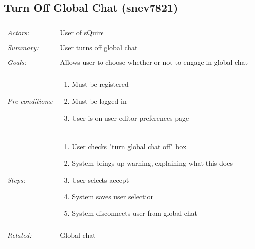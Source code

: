\documentclass[11pt]{report}
\begin{document}
\subsection{Turn Off Global Chat (snev7821)}
\begin{tabular}{ p{2cm} p{12cm} }
\hline
\\
	\textit{Actors:} & User of sQuire \\
	\\
	\textit{Summary:} & User turns off global chat \\
	\\
	\textit{Goals:} & Allows user to choose whether or not to engage in global chat \\
	\\
	\textit{Pre-conditions:} & \begin{enumerate}
		\item Must be registered
		\item Must be logged in
		\item User is on user editor preferences page
	\end{enumerate} \\
	\\
	\textit{Steps:} & \begin{enumerate}
		\item User checks "turn global chat off" box
		\item System brings up warning, explaining what this does
		\item User selects accept
		\item System saves user selection
		\item System disconnects user from global chat
	\end{enumerate} \\
	\\
	\textit{Related:} & Global chat \\
	\\
\hline
\end{tabular}
\newpage
\end{document}
